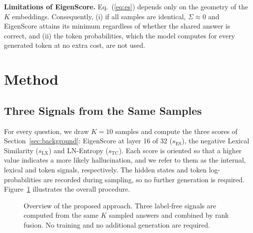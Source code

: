 \documentclass[conference]{IEEEtran}
\newcommand{\sES}{s_{\mathrm{ES}}}
\newcommand{\sLX}{s_{\mathrm{LX}}}
\newcommand{\sTC}{s_{\mathrm{TC}}}
\begin{document}
\textbf{Limitations of EigenScore.} Eq.~(\ref{eq:es}) depends only on the geometry of the $K$ embeddings. Consequently, (i) if all samples are identical, $\Sigma\approx 0$ and EigenScore attains its minimum regardless of whether the shared answer is correct, and (ii) the token probabilities, which the model computes for every generated token at no extra cost, are not used.

\section{Method}\label{sec:method}
\subsection{Three Signals from the Same Samples}
For every question, we draw $K=10$ samples and compute the three scores of Section~\ref{sec:background}: EigenScore at layer 16 of 32 ($\sES$), the negative Lexical Similarity ($\sLX$) and LN-Entropy ($\sTC$). Each score is oriented so that a higher value indicates a more likely hallucination, and we refer to them as the internal, lexical and token signals, respectively. The hidden states and token log-probabilities are recorded during sampling, so no further generation is required. Figure~\ref{fig:method} illustrates the overall procedure.

\begin{figure}[t]
\centering
{}
\caption{Overview of the proposed approach. Three label-free signals are computed from the same $K$ sampled answers and combined by rank fusion. No training and no additional generation are required.}
\label{fig:method}
\end{figure}
\end{document}
